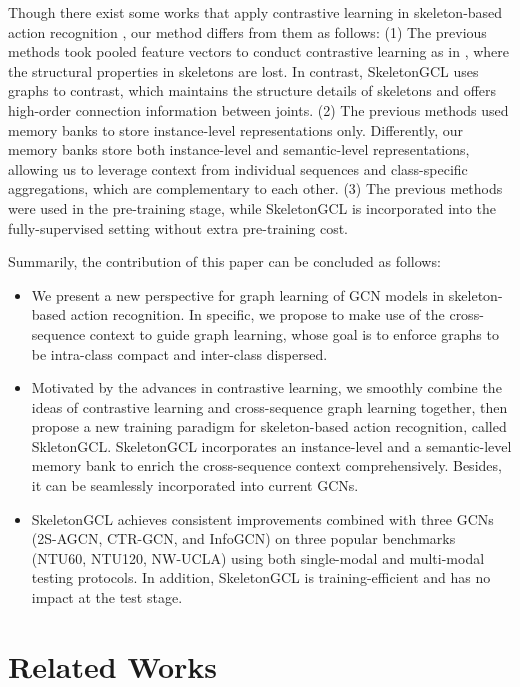 \documentclass{article} \usepackage{iclr2023_conference,times}
\begin{document}
Though there exist some works that apply contrastive learning in skeleton-based action recognition \citep{crossclr, Aimclr, CMD}, our method differs from them as follows: (1) The previous methods took pooled feature vectors to conduct contrastive learning as in \citep{moco,simclr}, where the structural properties in skeletons are lost. In contrast, SkeletonGCL uses graphs to contrast, which maintains the structure details of skeletons and offers high-order connection information between joints. (2) The previous methods used memory banks to store instance-level representations only. Differently, our memory banks store both instance-level and semantic-level representations, allowing us to leverage context from individual sequences and class-specific aggregations, which are complementary to each other. (3) The previous methods were used in the pre-training stage, while SkeletonGCL is incorporated into the fully-supervised setting without extra pre-training cost.

Summarily, the contribution of this paper can be concluded as follows:
\begin{itemize}
    \item We present a new perspective for graph learning of GCN models in skeleton-based action recognition. In specific, we propose to make use of the cross-sequence context to guide graph learning, whose goal is to enforce graphs to be intra-class compact and inter-class dispersed.
    \item Motivated by the advances in contrastive learning, we smoothly combine the ideas of contrastive learning and cross-sequence graph learning together, then propose a new training paradigm for skeleton-based action recognition, called SkletonGCL. SkeletonGCL incorporates an instance-level and a semantic-level memory bank to enrich the cross-sequence context comprehensively. Besides, it can be seamlessly incorporated into current GCNs.
    \item SkeletonGCL achieves consistent improvements combined with three GCNs (2S-AGCN, CTR-GCN, and InfoGCN) on three popular benchmarks (NTU60, NTU120, NW-UCLA) using both single-modal and multi-modal testing protocols. In addition, SkeletonGCL is training-efficient and has no impact at the test stage.
\end{itemize}

\section{Related Works}
\end{document}
